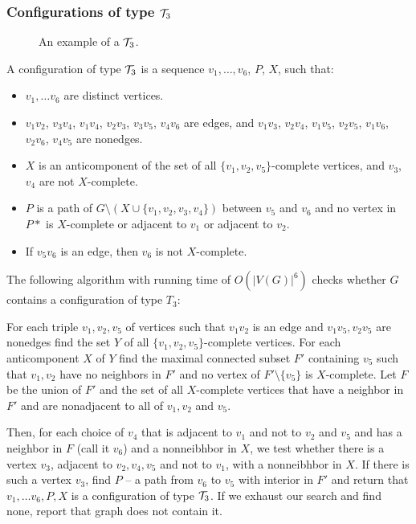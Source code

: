 \documentclass{report}
\begin{document}
\subsubsection{Configurations of type $\mathcal{T}_3$}

\begin{wrapfigure}{r}{0.35\textwidth}
	
	\caption{An example of a $\mathcal{T}_3$.}%
	\vspace{-1.5cm}
\end{wrapfigure}

A configuration of type $\mathcal{T}_3$ is a sequence $v_1, \ldots, v_6$, $P$, $X$, such that:
\begin{itemize}
	\item $v_1, \ldots v_6$ are distinct vertices.
	\item $v_1v_2$, $v_3v_4$, $v_1v_4$, $v_2v_3$, $v_3v_5$, $v_4v_6$ are edges, and $v_1v_3$, $v_2v_4$, $v_1v_5$, $v_2v_5$, $v_1v_6$, $v_2v_6$, $v_4v_5$ are nonedges.
	\item $X$ is an anticomponent of the set of all $\{v_1, v_2, v_5\}$-complete vertices, and $v_3$, $v_4$ are not $X$-complete.
	\item $P$ is a path of $G \setminus ( X \cup \{v_1, v_2, v_3, v_4\} )$ between $v_5$ and $v_6$ and no vertex in $P*$ is $X$-complete or adjacent to $v_1$ or adjacent to $v_2$.
	\item If $v_5v_6$ is an edge, then $v_6$ is not $X$-complete.
\end{itemize}

The following algorithm with running time of $O(|V(G)|^6)$ checks whether $G$ contains a configuration of type $T_3$:

For each triple $v_1, v_2, v_5$ of vertices such that $v_1v_2$ is an edge and $v_1v_5, v_2v_5$ are nonedges find the set $Y$ of all $\{v_1, v_2, v_5\}$-complete vertices. For each anticomponent $X$ of $Y$ find the maximal connected subset $F'$ containing $v_5$ such that $v_1, v_2$ have no neighbors in $F'$ and no vertex of $F'\setminus\{v_5\}$ is $X$-complete. Let $F$ be the union of $F'$ and the set of all $X$-complete vertices that have a neighbor in $F'$ and are nonadjacent to all of $v_1, v_2$ and $v_5$.

Then, for each choice of $v_4$ that is adjacent to $v_1$ and not to $v_2$ and $v_5$ and has a neighbor in $F$ (call it $v_6$) and a nonneibhbor in $X$, we test whether there is a vertex $v_3$, adjacent to $v_2, v_4, v_5$ and not to $v_1$, with a nonneibhbor in $X$. If there is such a vertex $v_3$, find $P$ -- a path from $v_6$ to $v_5$ with interior in $F'$ and return that $v_1, \ldots v_6, P, X$ is a configuration of type $\mathcal{T}_3$. If we exhaust our search and find none, report that graph does not contain it.
\end{document}

